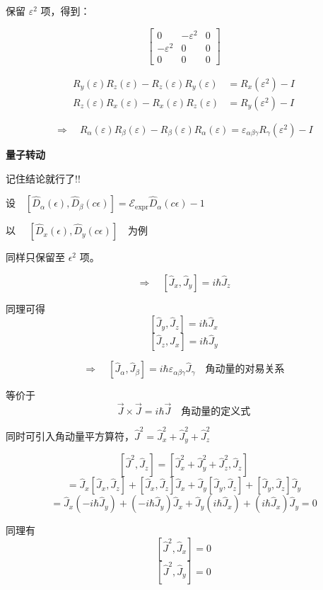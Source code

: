 \documentclass[lang=cn,10pt]{elegantbook}
\begin{document}
保留 \(\varepsilon^2\) 项，得到：

\[
\begin{bmatrix}
	0 & -\varepsilon^2 & 0 \\
	-\varepsilon^2 & 0 & 0 \\
	0 & 0 & 0
\end{bmatrix}
\]

\begin{align*}
	R_y(\varepsilon) R_z(\varepsilon) - R_z(\varepsilon) R_y(\varepsilon) &= R_x(\varepsilon^2) - I \\
	R_z(\varepsilon) R_x(\varepsilon) - R_x(\varepsilon) R_z(\varepsilon) &= R_y(\varepsilon^2) - I
\end{align*}

\[
\Longrightarrow \quad R_\alpha(\varepsilon) R_\beta(\varepsilon) - R_\beta(\varepsilon) R_\alpha(\varepsilon) = \varepsilon_{\alpha\beta\gamma} R_\gamma(\varepsilon^2) - I
\]


\textbf{量子转动}

记住结论就行了!!

$设 \quad \left[ \hat{D}_\alpha(\epsilon), \hat{D}_\beta(c\epsilon) \right] = \mathcal{E}_{\text{expr}} \hat{D}_\alpha(c\epsilon) - 1$

以 $\quad \left[ \hat{D}_x(\epsilon), \hat{D}_y(c\epsilon) \right] \quad \text{为例}$

同样只保留至 \(\epsilon^2\) 项。


\[
\Rightarrow \quad [\hat{J}_x, \hat{J}_y] = i \hbar \hat{J}_z
\]


同理可得
\[
[\hat{J}_y, \hat{J}_z] = i\hbar \hat{J}_x
\]
\[
[\hat{J}_z, \hat{J}_x] = i\hbar \hat{J}_y
\]

\[
\Rightarrow \quad [\hat{J}_\alpha, \hat{J}_\beta] = i\hbar \varepsilon_{\alpha\beta\gamma} \hat{J}_\gamma \quad \text{角动量的对易关系}
\]

等价于
\[
\vec{J} \times \vec{J} = i\hbar \vec{J} \quad \text{角动量的定义式}
\]

同时可引入角动量平方算符，\(\hat{J}^2 = \hat{J}_x^2 + \hat{J}_y^2 + \hat{J}_z^2\)

\[
[\hat{J}^2, \hat{J}_z] = [\hat{J}_x^2 + \hat{J}_y^2 + \hat{J}_z^2, \hat{J}_z]
\]
\[
= \hat{J}_x [\hat{J}_x, \hat{J}_z] + [\hat{J}_x, \hat{J}_z] \hat{J}_x + \hat{J}_y [\hat{J}_y, \hat{J}_z] + [\hat{J}_y, \hat{J}_z] \hat{J}_y
\]
\[
= \hat{J}_x (-i\hbar \hat{J}_y) + (-i\hbar \hat{J}_y) \hat{J}_x + \hat{J}_y (i\hbar \hat{J}_x) + (i\hbar \hat{J}_x) \hat{J}_y = 0
\]

同理有
\[
[\hat{J}^2, \hat{J}_x] = 0
\]
\[
[\hat{J}^2, \hat{J}_y] = 0
\]
\end{document}
